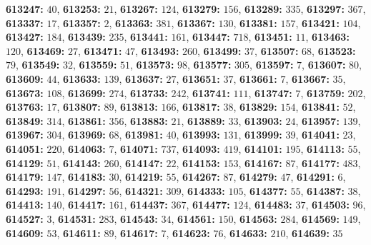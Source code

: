 \textsf{\bfseries 613247:} $40$, \textsf{\bfseries 613253:} $21$, \textsf{\bfseries 613267:} $124$, \textsf{\bfseries 613279:} $156$, \textsf{\bfseries 613289:} $335$, \textsf{\bfseries 613297:} $367$, \textsf{\bfseries 613337:} $17$, \textsf{\bfseries 613357:} $2$, \textsf{\bfseries 613363:} $381$, \textsf{\bfseries 613367:} $130$, \textsf{\bfseries 613381:} $157$, \textsf{\bfseries 613421:} $104$, \textsf{\bfseries 613427:} $184$, \textsf{\bfseries 613439:} $235$, \textsf{\bfseries 613441:} $161$, \textsf{\bfseries 613447:} $718$, \textsf{\bfseries 613451:} $11$, \textsf{\bfseries 613463:} $120$, \textsf{\bfseries 613469:} $27$, \textsf{\bfseries 613471:} $47$, \textsf{\bfseries 613493:} $260$, \textsf{\bfseries 613499:} $37$, \textsf{\bfseries 613507:} $68$, \textsf{\bfseries 613523:} $79$, \textsf{\bfseries 613549:} $32$, \textsf{\bfseries 613559:} $51$, \textsf{\bfseries 613573:} $98$, \textsf{\bfseries 613577:} $305$, \textsf{\bfseries 613597:} $7$, \textsf{\bfseries 613607:} $80$, \textsf{\bfseries 613609:} $44$, \textsf{\bfseries 613633:} $139$, \textsf{\bfseries 613637:} $27$, \textsf{\bfseries 613651:} $37$, \textsf{\bfseries 613661:} $7$, \textsf{\bfseries 613667:} $35$, \textsf{\bfseries 613673:} $108$, \textsf{\bfseries 613699:} $274$, \textsf{\bfseries 613733:} $242$, \textsf{\bfseries 613741:} $111$, \textsf{\bfseries 613747:} $7$, \textsf{\bfseries 613759:} $202$, \textsf{\bfseries 613763:} $17$, \textsf{\bfseries 613807:} $89$, \textsf{\bfseries 613813:} $166$, \textsf{\bfseries 613817:} $38$, \textsf{\bfseries 613829:} $154$, \textsf{\bfseries 613841:} $52$, \textsf{\bfseries 613849:} $314$, \textsf{\bfseries 613861:} $356$, \textsf{\bfseries 613883:} $21$, \textsf{\bfseries 613889:} $33$, \textsf{\bfseries 613903:} $24$, \textsf{\bfseries 613957:} $139$, \textsf{\bfseries 613967:} $304$, \textsf{\bfseries 613969:} $68$, \textsf{\bfseries 613981:} $40$, \textsf{\bfseries 613993:} $131$, \textsf{\bfseries 613999:} $39$, \textsf{\bfseries 614041:} $23$, \textsf{\bfseries 614051:} $220$, \textsf{\bfseries 614063:} $7$, \textsf{\bfseries 614071:} $737$, \textsf{\bfseries 614093:} $419$, \textsf{\bfseries 614101:} $195$, \textsf{\bfseries 614113:} $55$, \textsf{\bfseries 614129:} $51$, \textsf{\bfseries 614143:} $260$, \textsf{\bfseries 614147:} $22$, \textsf{\bfseries 614153:} $153$, \textsf{\bfseries 614167:} $87$, \textsf{\bfseries 614177:} $483$, \textsf{\bfseries 614179:} $147$, \textsf{\bfseries 614183:} $30$, \textsf{\bfseries 614219:} $55$, \textsf{\bfseries 614267:} $87$, \textsf{\bfseries 614279:} $47$, \textsf{\bfseries 614291:} $6$, \textsf{\bfseries 614293:} $191$, \textsf{\bfseries 614297:} $56$, \textsf{\bfseries 614321:} $309$, \textsf{\bfseries 614333:} $105$, \textsf{\bfseries 614377:} $55$, \textsf{\bfseries 614387:} $38$, \textsf{\bfseries 614413:} $140$, \textsf{\bfseries 614417:} $161$, \textsf{\bfseries 614437:} $367$, \textsf{\bfseries 614477:} $124$, \textsf{\bfseries 614483:} $37$, \textsf{\bfseries 614503:} $96$, \textsf{\bfseries 614527:} $3$, \textsf{\bfseries 614531:} $283$, \textsf{\bfseries 614543:} $34$, \textsf{\bfseries 614561:} $150$, \textsf{\bfseries 614563:} $284$, \textsf{\bfseries 614569:} $149$, \textsf{\bfseries 614609:} $53$, \textsf{\bfseries 614611:} $89$, \textsf{\bfseries 614617:} $7$, \textsf{\bfseries 614623:} $76$, 
\textsf{\bfseries 614633:} $210$, \textsf{\bfseries 614639:} $35$